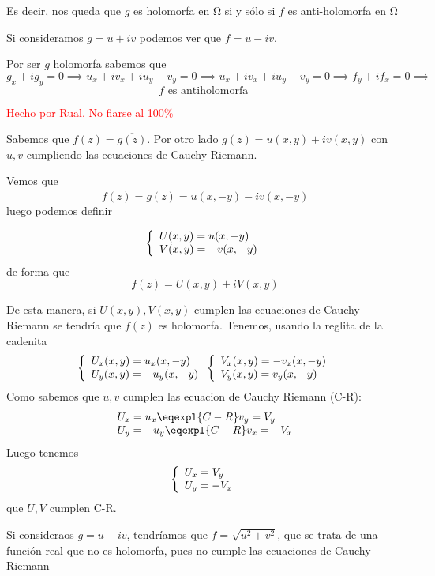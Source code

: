 \begin{problem}[7]
Es decir, nos queda que $g$ es holomorfa en Ω si y sólo si $f$ es anti-holomorfa en Ω

\spart
{}

Si consideramos $g=u+iv$ podemos ver que $f=u-iv$.

Por ser $g$ holomorfa sabemos que
\[g_x+ig_y = 0 \implies u_x+iv_x+iu_y-v_y = 0\implies u_x+iv_x+iu_y-v_y = 0 \implies f_y+if_x=0 \implies\]
\[f \text{ es antiholomorfa }\]


\spart
\textcolor{red}{Hecho por Rual. No fiarse al 100\%}

Sabemos que $f(z) = \overline{g(\overline{z})}$. Por otro lado $g(z) = u(x,y)+iv(x,y)$ con $u,v$ cumpliendo las ecuaciones de Cauchy-Riemann.


Vemos que $$f(z) = \overline{g(\overline{z})} = u(x,-y)-iv(x,-y)$$ luego podemos definir

\begin{equation*}
\left\{
\begin{array}{l l}
U(x,y) = u(x,-y)\\
V(x,y) = -v(x,-y)\\
\end{array}
\right.
\end{equation*}
de forma que $$f(z) = U(x,y)+iV(x,y)$$

De esta manera, si $U(x,y), V(x,y)$ cumplen las ecuaciones de Cauchy-Riemann se tendría que $f(z)$ es holomorfa.
Tenemos, usando la reglita de la cadenita
\begin{equation*}
\left\{
\begin{array}{l l}
U_x(x,y) = u_x(x,-y)\\
U_y(x,y) = -u_y(x,-y)\\
\end{array}
\right.
\left\{
\begin{array}{l l}
V_x(x,y) = -v_x(x,-y)\\
V_y(x,y) = v_y(x,-y)\\
\end{array}
\right.
\end{equation*}
Como sabemos que $u,v$ cumplen las ecuacion de Cauchy Riemann (C-R):
\begin{equation*}
\begin{array}{l l}
U_x=u_x\eqexpl{C-R}v_y=V_y\\
U_y=-u_y\eqexpl{C-R}v_x=-V_x
\end{array}
\end{equation*}
Luego tenemos
\begin{equation*}
\left\{
\begin{array}{l l}
U_x=V_y\\
U_y=-V_x
\end{array}
\right.
\end{equation*}
que $U,V$ cumplen C-R.

\spart
{}

Si consideraos $g=u+iv$, tendríamos que $f=\sqrt{u^2+v^2}$, que se trata de una función real que no es holomorfa, pues no cumple las ecuaciones de Cauchy-Riemann

\end{problem}


